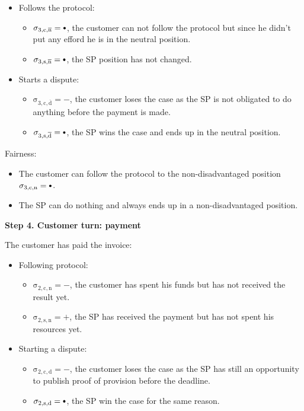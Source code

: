 \documentclass{ieeeaccess}
\newcommand\neutral[1][.75]{\mathbin{\ThisStyle{\vcenter{\hbox{%
  \scalebox{#1}{$\SavedStyle\bullet$}}}}}%
}
\begin{document}
\begin{itemize}
\item
  Follows the protocol:

  \begin{itemize}
  
  \item
    \(\operatorname{\sigma_{3, c, \overline{n}} = \neutral}\), the customer can not follow the protocol but since he didn't put any efford he is in the neutral position.
  \item
    \(\operatorname{\sigma_{3, s, \overline{n}} = \neutral}\), the SP position has not changed.
  \end{itemize}
\item
  Starts a dispute:

  \begin{itemize}
  
  \item
    \(\operatorname{\sigma_{3, c, \overline{d}} = -}\), the customer loses the case as the SP is not obligated to do anything before the payment is made.
  \item
    \(\operatorname{\sigma_{3, s, \overline{d}} = \neutral}\), the SP wins the case and ends up in the neutral position.
  \end{itemize}
\end{itemize}

Fairness:

\begin{itemize}

\item The customer can follow the protocol to the non-disadvantaged position \(\operatorname{\sigma_{3, c, n} = \neutral}\).
\item The SP can do nothing and always ends up in a non-disadvantaged position.
\end{itemize}



\noindent \textbf
{Step 4. Customer turn: payment}

The customer has paid the invoice:

\begin{itemize}
\item
  Following protocol:
  \begin{itemize}
  \item
    \(\operatorname{\sigma_{2, c, n} = -}\), the customer has spent his funds but has not received the result yet.
  \item
    \(\operatorname{\sigma_{2, s, n} = +}\), the SP has received the payment but has not spent his resources yet.
  \end{itemize}
\item
  Starting a dispute:

  \begin{itemize}
  \item
    \(\operatorname{\sigma_{2, c, d} = -}\), the customer loses the case as the SP has still an opportunity to publish proof of provision before the deadline.
  \item
    \(\operatorname{\sigma_{2, s, d} = \neutral}\), the SP win the case for the same reason.
  \end{itemize}
\end{itemize}
\end{document}
